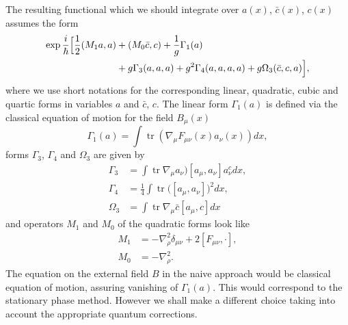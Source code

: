 \documentclass[12pt]{article}
\DeclareMathOperator{\tr}{tr}
\begin{document}
	The resulting functional which we should integrate over
    $ a(x) $, $ \bar{c}(x) $, $ c(x) $
	assumes the form
\begin{equation}
\begin{split}
    \exp \frac{i}{\hbar} \Bigl[ \frac{1}{2} (M_{1}a, a) & +(M_{0} \bar{c}, c)
	+ \frac{1}{g} \Gamma_{1}(a)  \\
	  &+ g \Gamma_{3}(a,a,a) + g^{2} \Gamma_{4}(a,a,a,a)
	    + g \Omega_{3} (\bar{c}, c, a) \Bigr] ,
\end{split}
\end{equation}
	where we use short notations for the corresponding linear,
	quadratic, cubic and quartic forms in variables
    $ a $ and
    $ \bar{c} $, $ c $.
	The linear form
    $ \Gamma_{1}(a) $
	is defined via the classical equation of motion for
	the field
    $ B_{\mu}(x) $
\begin{equation}
\label{G1}
    \Gamma_{1}(a) = \int \tr (\nabla_{\mu} F_{\mu\nu}(x) a_{\nu}(x)) dx ,
\end{equation}
	forms 
    $ \Gamma_{3} $,
    $ \Gamma_{4} $
	and
    $ \Omega_{3} $
	are given by
\begin{align}
    \Gamma_{3} & = \int \tr \nabla_{\mu} a_{\nu}) [a_{\mu}, a_{\nu}]
	a_{\nu}^{c} dx ,\\
    \Gamma_{4} & = \frac{1}{4} \int \tr \bigl([a_{\mu}, a_{\nu}]
	\bigr)^{2} dx ,\\
\label{O3}
    \Omega_{3} & = \int \tr \nabla_{\mu} \bar{c} [a_{\mu}, c
] dx
\end{align}
	and operators 
    $ M_{1} $ and
    $ M_{0} $
	of the quadratic forms look like
\begin{align}
    M_{1} & = - \nabla_{\rho}^{2} \delta_{\mu\nu} + 2 [F_{\mu\nu}, \cdot] ,\\
    M_{0} & = - \nabla_{\rho}^{2} .
\end{align}
	The equation on the external field
    $ B $
	in the naive approach would be classical equation of motion,
	assuring vanishing of 
    $ \Gamma_{1}(a) $.
	This would correspond to the stationary phase method.
	However we shall make a different choice taking into account
	the appropriate quantum corrections.
\end{document}
